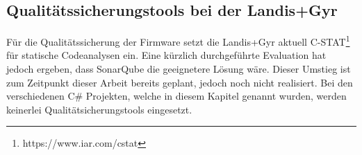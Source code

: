 \subsection{Qualitätssicherungstools bei der Landis+Gyr}
Für die Qualitätssicherung der Firmware setzt die Landis+Gyr aktuell C-STAT\footnote{https://www.iar.com/cstat} für statische Codeanalysen ein.
Eine kürzlich durchgeführte Evaluation hat jedoch ergeben, dass SonarQube die geeignetere Lösung wäre.
Dieser Umstieg ist zum Zeitpunkt dieser Arbeit bereits geplant, jedoch noch nicht realisiert.
Bei den verschiedenen C\# Projekten, welche in diesem Kapitel genannt wurden, werden keinerlei Qualitätsicherungstools eingesetzt.
